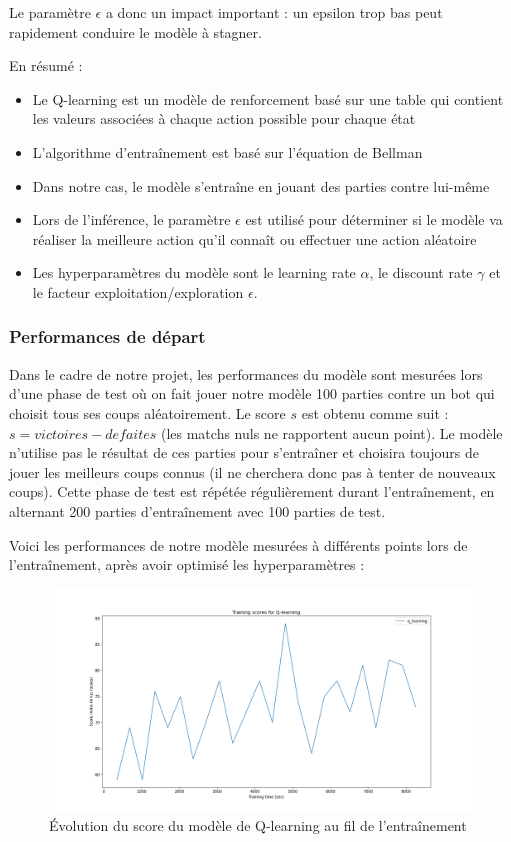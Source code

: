 \documentclass[french]{article}
\begin{document}
    Le paramètre $\epsilon$ a donc un impact important : un epsilon trop bas peut rapidement conduire le modèle à stagner.

    En résumé :
    \begin{itemize}
        \item Le Q-learning est un modèle de renforcement basé sur une table qui contient les valeurs associées à chaque action possible pour chaque état
        \item L'algorithme d'entraînement est basé sur l'équation de Bellman
        \item Dans notre cas, le modèle s'entraîne en jouant des parties contre lui-même
        \item Lors de l'inférence, le paramètre $\epsilon$ est utilisé pour déterminer si le modèle va réaliser la meilleure action qu'il connaît ou effectuer une action aléatoire
        \item Les hyperparamètres du modèle sont le learning rate $\alpha$, le discount rate $\gamma$ et le facteur exploitation/exploration $\epsilon$.
    \end{itemize}


    \subsubsection{Performances de départ}

    Dans le cadre de notre projet, les performances du modèle sont mesurées lors d'une phase de test où on fait jouer notre modèle 100 parties contre un bot qui choisit tous ses coups aléatoirement. Le score $s$ est obtenu comme suit : $s = victoires - defaites$ (les matchs nuls ne rapportent aucun point). Le modèle n'utilise pas le résultat de ces parties pour s'entraîner et choisira toujours de jouer les meilleurs coups connus (il ne cherchera donc pas à tenter de nouveaux coups). Cette phase de test est répétée régulièrement durant l'entraînement, en alternant 200 parties d'entraînement avec 100 parties de test.
    
    Voici les performances de notre modèle mesurées à différents points lors de l'entraînement, après avoir optimisé les hyperparamètres :

    \begin{figure}[h]
        \includegraphics[width=12cm]{q_learning_metrics}
        \centering
        \caption{Évolution du score du modèle de Q-learning au fil de l'entraînement}
        \centering
    \end{figure}
\end{document}
